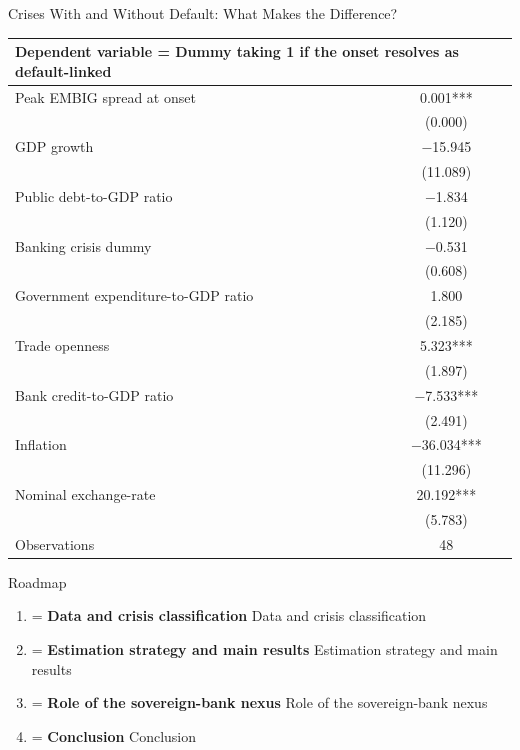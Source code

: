 \documentclass[aspectratio=169]{beamer}
\newcounter{sectionmark}
\newcommand{\roadmapitem}[2]{%
  \ifnum#1=\value{sectionmark}%
    {\bfseries#2}%
  \else
    #2%
  \fi
}
\newcommand{\sectionroadmap}[1]{%
  \setcounter{sectionmark}{#1}%
  \begin{frame}{Roadmap}
    \footnotesize
    \begin{enumerate}
      \item \roadmapitem{1}{Data and crisis classification}
      \item \roadmapitem{2}{Estimation strategy and main results}
      \item \roadmapitem{3}{Role of the sovereign-bank nexus}
      \item \roadmapitem{4}{Conclusion}
    \end{enumerate}
  \end{frame}
}
\begin{document}
\begin{frame}{ Crises With and Without Default: What Makes the Difference?}
  \footnotesize

 \tiny
  \begin{center}
  \renewcommand{\arraystretch}{0.85}
  \setlength{\tabcolsep}{5pt}
  \begin{tabular}{lc}
  \toprule
  \multicolumn{2}{l}{Dependent variable = Dummy taking 1 if the onset resolves as default-linked} \\
  \midrule
  Peak EMBIG spread at onset & 0.001*** \\
   & (0.000) \\[2pt]
  GDP growth & $-$15.945 \\
   & (11.089) \\[2pt]
  Public debt-to-GDP ratio & $-$1.834 \\
   & (1.120) \\[2pt]
  Banking crisis dummy & $-$0.531 \\
   & (0.608) \\[2pt]
  Government expenditure-to-GDP ratio & 1.800 \\
   & (2.185) \\[2pt]
  Trade openness & 5.323*** \\
   & (1.897) \\[2pt]
  Bank credit-to-GDP ratio & $-$7.533*** \\
   & (2.491) \\[2pt]
  Inflation & $-$36.034*** \\
   & (11.296) \\[2pt]
  Nominal exchange-rate & 20.192*** \\
   & (5.783) \\
  \midrule
  Observations & 48 \\
  \bottomrule
  \end{tabular}
  \end{center}

\end{frame}


\sectionroadmap{3}
\end{document}
